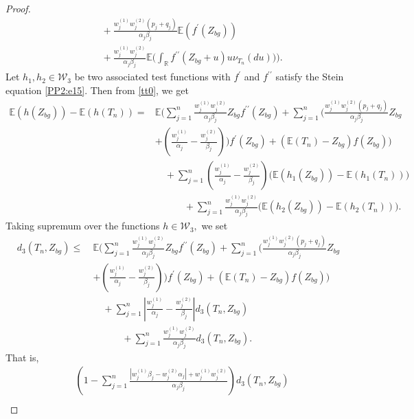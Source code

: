 \documentclass[12pt, a4paper,reqno]{amsart}
\theoremstyle{definition}
\theoremstyle{myremark}
\numberwithin{equation}{section}
\begin{document}
\begin{proof}
\begin{align}
	\nonumber&\quad\quad+\frac{w_{j}^{(1)}w_{j}^{(2)}(p_j+q_j)}{\alpha_j \beta_j}\mathbb{E}\left(f^{\prime}(Z_{bg}) \right)\\
&\quad\quad+	\frac{w_{j}^{(1)}w_{j}^{(2)}}{\alpha_j \beta_j}\mathbb{E}\bigg(\displaystyle\int_{\mathbb{{R}}}f^{\prime\prime}(Z_{bg}+u)u\nu_{T_n}(du) \bigg)\bigg).\label{tt0}
	\end{align}
	\noindent
	Let $h_1,h_2 \in \mathcal{W}_3$ be two associated test functions with $f^\prime$ and $f^{\prime\prime}$ satisfy the Stein equation \eqref{PP2:e15}. Then from \eqref{tt0}, we get
	\begin{align}
	\nonumber\mathbb{E}(h(Z_{bg}))-\mathbb{E}(h(T_n)) =&\mathbb{E}\bigg(	\sum_{j=1}^{n}\frac{w_{j}^{(1)}w_{j}^{(2)}}{\alpha_j \beta_j}Z_{bg}f^{\prime\prime}(Z_{bg})+ \sum_{j=1}^{n}\bigg(\frac{w_{j}^{(1)}w_{j}^{(2)}(p_j+q_j)}{\alpha_j \beta_j}Z_{bg}\\
\nonumber	&+ \left(\frac{w_{j}^{(1)} }{\alpha_j}-\frac{w_{j}^{(2)}}{\beta_j} \right)\bigg)f^{\prime}(Z_{bg})+\left(  \mathbb{E}(T_n) -Z_{bg} \right)f(Z_{bg})  \bigg)\\
	\nonumber&\quad +\sum_{j=1}^{n}\left(\frac{w_{j}^{(1)} }{\alpha_j}-\frac{w_{j}^{(2)}}{\beta_j} \right)\bigg(\mathbb{E}(h_1(Z_{bg}))-\mathbb{E}(h_1(T_n))\bigg)\\
	&\quad\quad\quad+ \sum_{j=1}^{n}\frac{w_{j}^{(1)}w_{j}^{(2)}}{\alpha_j \beta_j} \bigg(\mathbb{E}(h_2(Z_{bg}))-\mathbb{E}(h_2(T_n))\bigg).\label{ibpf5}
	\end{align}
	\noindent
	Taking supremum over the functions $h \in \mathcal{W}_3,$ we set
\begin{align}
	\nonumber d_3(T_n,Z_{bg}) \leq ~&\mathbb{E}\bigg(	\sum_{j=1}^{n}\frac{w_{j}^{(1)}w_{j}^{(2)}}{\alpha_j \beta_j}Z_{bg}f^{\prime\prime}(Z_{bg})+ \sum_{j=1}^{n}\bigg(\frac{w_{j}^{(1)}w_{j}^{(2)}(p_j+q_j)}{\alpha_j \beta_j}Z_{bg}\\
	\nonumber	&+ \left(\frac{w_{j}^{(1)} }{\alpha_j}-\frac{w_{j}^{(2)}}{\beta_j} \right)\bigg)f^{\prime}(Z_{bg})+\left(  \mathbb{E}(T_n) -Z_{bg} \right)f(Z_{bg})  \bigg)\\
	\nonumber&\quad +\sum_{j=1}^{n}\left|\frac{w_{j}^{(1)} }{\alpha_j}-\frac{w_{j}^{(2)}}{\beta_j} \right| d_3(T_n,Z_{bg})\\
	&\quad\quad\quad+ \sum_{j=1}^{n}\frac{w_{j}^{(1)}w_{j}^{(2)}}{\alpha_j \beta_j}  d_3(T_n,Z_{bg}).\label{ibpf7}
	\end{align}
	\noindent
	That is,
	\begin{align}
	\nonumber&\left(1 - \sum_{j=1}^{n}\frac{|w_{j}^{(1)}\beta_j-w_{j}^{(2)}\alpha_j|+w_j^{(1)} w_j^{(2)}}{\alpha_j \beta_j} \right)d_{3}(T_n,Z_{bg})\\	

\end{align}
\end{proof}
\end{document}
